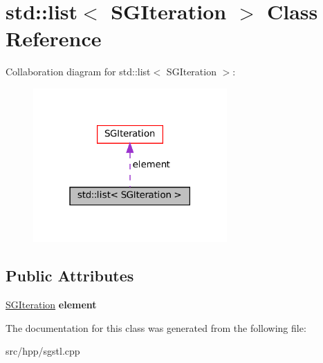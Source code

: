 \hypertarget{classstd_1_1list_3_01SGIteration_01_4}{}\section{std\+:\+:list$<$ S\+G\+Iteration $>$ Class Reference}
\label{classstd_1_1list_3_01SGIteration_01_4}


Collaboration diagram for std\+:\+:list$<$ S\+G\+Iteration $>$\+:
\nopagebreak
\begin{figure}[H]
\begin{center}
\leavevmode
\includegraphics[width=210pt]{classstd_1_1list_3_01SGIteration_01_4__coll__graph}
\end{center}
\end{figure}
\subsection*{Public Attributes}
\begin{DoxyCompactItemize}
\item 
\mbox{\label{classstd_1_1list_3_01SGIteration_01_4_a3ae13353092ca4ddc13181f31e4193fe}} 
\hyperlink{classSGIteration}{S\+G\+Iteration} {\bfseries element}
\end{DoxyCompactItemize}


The documentation for this class was generated from the following file\+:\begin{DoxyCompactItemize}
\item 
src/hpp/sgstl.\+cpp\end{DoxyCompactItemize}
